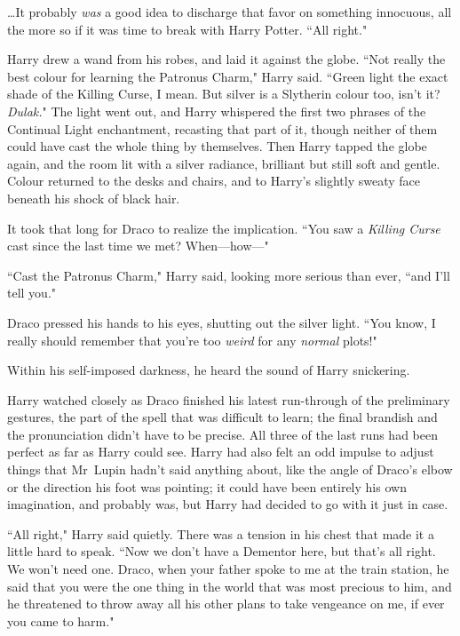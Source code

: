 {\ldots}It probably \emph{was} a good idea to discharge that favor on something innocuous, all the more so if it was time to break with Harry Potter. ``All right."

Harry drew a wand from his robes, and laid it against the globe. ``Not really the best colour for learning the Patronus Charm," Harry said. ``Green light the exact shade of the Killing Curse, I mean. But silver is a Slytherin colour too, isn't it? \emph{Dulak.}" The light went out, and Harry whispered the first two phrases of the Continual Light enchantment, recasting that part of it, though neither of them could have cast the whole thing by themselves. Then Harry tapped the globe again, and the room lit with a silver radiance, brilliant but still soft and gentle. Colour returned to the desks and chairs, and to Harry's slightly sweaty face beneath his shock of black hair.

It took that long for Draco to realize the implication. ``You saw a \emph{Killing Curse} cast since the last time we met? When—how—"

``Cast the Patronus Charm," Harry said, looking more serious than ever, ``and I'll tell you."

Draco pressed his hands to his eyes, shutting out the silver light. ``You know, I really should remember that you're too \emph{weird} for any \emph{normal} plots!"

Within his self-imposed darkness, he heard the sound of Harry snickering.

\later

Harry watched closely as Draco finished his latest run-through of the preliminary gestures, the part of the spell that was difficult to learn; the final brandish and the pronunciation didn't have to be precise. All three of the last runs had been perfect as far as Harry could see. Harry had also felt an odd impulse to adjust things that Mr~Lupin hadn't said anything about, like the angle of Draco's elbow or the direction his foot was pointing; it could have been entirely his own imagination, and probably was, but Harry had decided to go with it just in case.

``All right," Harry said quietly. There was a tension in his chest that made it a little hard to speak. ``Now we don't have a Dementor here, but that's all right. We won't need one. Draco, when your father spoke to me at the train station, he said that you were the one thing in the world that was most precious to him, and he threatened to throw away all his other plans to take vengeance on me, if ever you came to harm."

